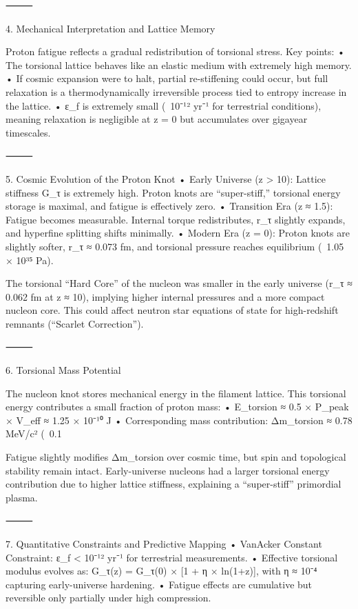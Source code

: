 ⸻

4. Mechanical Interpretation and Lattice Memory

Proton fatigue reflects a gradual redistribution of torsional stress. Key points:
	•	The torsional lattice behaves like an elastic medium with extremely high memory.
	•	If cosmic expansion were to halt, partial re-stiffening could occur, but full relaxation is a thermodynamically irreversible process tied to entropy increase in the lattice.
	•	ε_f is extremely small (~10⁻¹² yr⁻¹ for terrestrial conditions), meaning relaxation is negligible at z = 0 but accumulates over gigayear timescales.

⸻

5. Cosmic Evolution of the Proton Knot
	•	Early Universe (z > 10): Lattice stiffness G_τ is extremely high. Proton knots are “super-stiff,” torsional energy storage is maximal, and fatigue is effectively zero.
	•	Transition Era (z ≈ 1.5): Fatigue becomes measurable. Internal torque redistributes, r_τ slightly expands, and hyperfine splitting shifts minimally.
	•	Modern Era (z = 0): Proton knots are slightly softer, r_τ ≈ 0.073 fm, and torsional pressure reaches equilibrium (~1.05 × 10³⁵ Pa).

The torsional “Hard Core” of the nucleon was smaller in the early universe (r_τ ≈ 0.062 fm at z ≈ 10), implying higher internal pressures and a more compact nucleon core. This could affect neutron star equations of state for high-redshift remnants (“Scarlet Correction”).

⸻

6. Torsional Mass Potential

The nucleon knot stores mechanical energy in the filament lattice. This torsional energy contributes a small fraction of proton mass:
	•	E_torsion ≈ 0.5 × P_peak × V_eff ≈ 1.25 × 10⁻¹⁰ J
	•	Corresponding mass contribution: Δm_torsion ≈ 0.78 MeV/c² (~0.1%

Fatigue slightly modifies Δm_torsion over cosmic time, but spin and topological stability remain intact. Early-universe nucleons had a larger torsional energy contribution due to higher lattice stiffness, explaining a “super-stiff” primordial plasma.

⸻

7. Quantitative Constraints and Predictive Mapping
	•	VanAcker Constant Constraint: ε_f < 10⁻¹² yr⁻¹ for terrestrial measurements.
	•	Effective torsional modulus evolves as: G_τ(z) = G_τ(0) × [1 + η × ln(1+z)], with η ≈ 10⁻⁴ capturing early-universe hardening.
	•	Fatigue effects are cumulative but reversible only partially under high compression.

